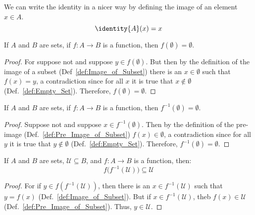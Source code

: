     We can write the identity in a nicer way by defining the image of an element
    $x\in{A}$.
    \begin{equation}
        \identity{A}(x)=x
    \end{equation}
    \begin{theorem}
        \label{thm:Image_of_Empty_Set_Is_Empty}%
        If $A$ and $B$ are sets, if $f:A\rightarrow{B}$ is a function,
        then $f(\emptyset)=\emptyset$.
    \end{theorem}
    \begin{proof}
        For suppose not and suppose $y\in{f}(\emptyset)$. But then by the
        definition of the image of a subset (Def~\ref{def:Image_of_Subset})
        there is an $x\in\emptyset$ such that $f(x)=y$, a contradiction since
        for all $x$ it is true that $x\notin\emptyset$
        (Def.~\ref{def:Empty_Set}). Therefore, $f(\emptyset)=\emptyset$.
    \end{proof}
    \begin{theorem}
        \label{thm:Pre_Image_of_Empty_Set_Is_Empty}%
        If $A$ and $B$ are sets, if $f:A\rightarrow{B}$ is a function, then
        $f^{\minus{1}}(\emptyset)=\emptyset$.
    \end{theorem}
    \begin{proof}
        Suppose not and suppose $x\in{f}^{\minus{1}}(\emptyset)$. Then by the
        definition of the pre-image (Def.~\ref{def:Pre_Image_of_Subset})
        $f(x)\in\emptyset$, a contradiction since for all $y$ it is true that
        $y\notin\emptyset$ (Def.~\ref{def:Empty_Set}). Therefore,
        $f^{\minus{1}}(\emptyset)=\emptyset$.
    \end{proof}
    \begin{theorem}
        \label{thm:Image_of_PreImage_is_Subset}%
        If $A$ and $B$ are sets, $\mathcal{U}\subseteq{B}$, and
        $f:A\rightarrow{B}$ is a function, then:
        \begin{equation*}
            f\big(f^{\minus{1}}(\mathcal{U})\big)\subseteq\mathcal{U}
        \end{equation*}
    \end{theorem}
    \begin{proof}
        For if $y\in{f(f^{\minus{1}}(\mathcal{U}))}$, then there is an
        $x\in{f^{\minus{1}}(\mathcal{U})}$ such that $y=f(x)$
        (Def.~\ref{def:Image_of_Subset}). But if
        $x\in{f^{\minus{1}}(\mathcal{U})}$, theb $f(x)\in\mathcal{U}$
        (Def.~\ref{def:Pre_Image_of_Subset}). Thus, $y\in\mathcal{U}$.
    \end{proof}
